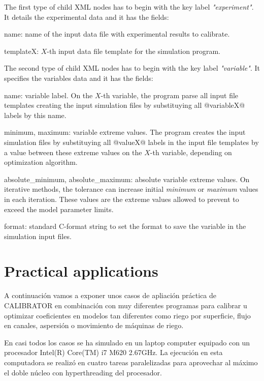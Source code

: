 \documentclass[review,authoryear]{elsarticle}
\begin{document}
The first type of child XML nodes has to begin with the key label
\emph{"experiment"}. It details the experimental data and it has the fields:
\begin{description}
\item{name}: name of the input data file with experimental results to calibrate.
\item{templateX}: $X$-th input data file template for the simulation program.
\end{description}

The second type of child XML nodes has to begin with the key label
\emph{"variable"}. It specifies the variables data and it has the fields:
\begin{description}
\item{name}: variable label. On the $X$-th variable, the program parse all input
file templates creating the input simulation files by substituying all
@variableX@ labels by this name.
\item{minimum, maximum}: variable extreme values. The program creates the input
simulation files by substituying all @valueX@ labels in the input file templates
by a value between these extreme values on the $X$-th variable, depending on
optimization algorithm.
\item{absolute\_minimum, absolute\_maximum}: absolute variable extreme values.
On iterative methods, the tolerance can increase initial \emph{minimum} or
\emph{maximum} values in each iteration. These values are the extreme values
allowed to prevent to exceed the model parameter limits.
\item{format}: standard C-format string to set the format to save the variable
in the simulation input files.
\end{description}

\section{Practical applications}

A continuación vamos a exponer unos casos de apliación práctica de CALIBRATOR en
combinación con muy diferentes programas para calibrar u optimizar coeficientes
en modelos tan diferentes como riego por superficie, flujo en canales, aspersión
o movimiento de máquinas de riego.

En casi todos los casos se ha simulado en un laptop computer equipado con un
procesador Intel(R) Core(TM) i7 M620 2.67GHz. La ejecución en esta computadora
se realizó en cuatro tareas paralelizadas para aprovechar al máximo el doble
núcleo con hyperthreading del procesador.
\end{document}
